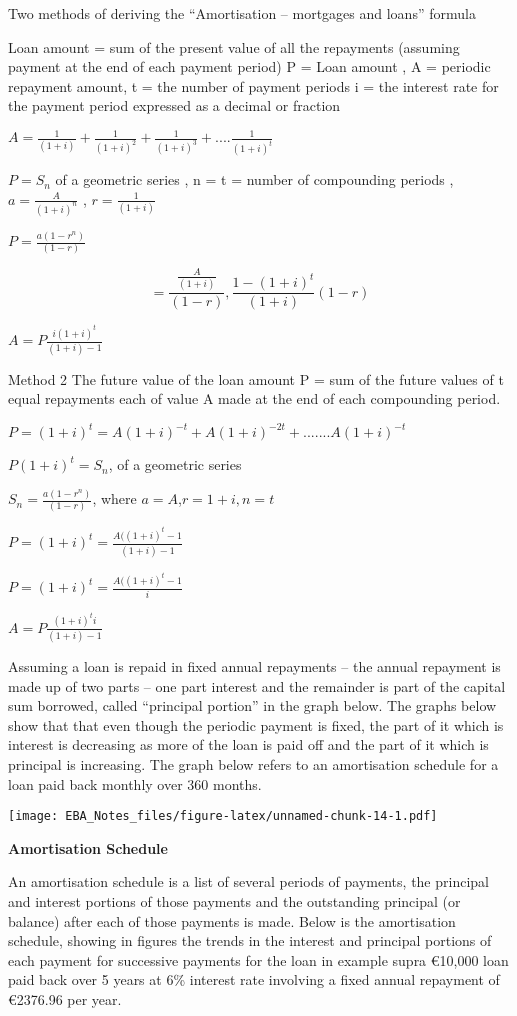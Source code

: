 \documentclass[]{book}
\newcommand{\euro}{€}
\theoremstyle{definition}
\theoremstyle{definition}
\theoremstyle{definition}
\theoremstyle{remark}
\begin{document}
Two methods of deriving the ``Amortisation -- mortgages and loans''
formula

Loan amount = sum of the present value of all the repayments (assuming
payment at the end of each payment period) P = Loan amount , A =
periodic repayment amount, t = the number of payment periods i = the
interest rate for the payment period expressed as a decimal or fraction

\(A =\frac{1}{(1+i)} + \frac{1}{(1+i)^2} + \frac{1}{(1+i)^3} + .... \frac{1}{(1+i)^t}\)

\(P=S_n\) of a geometric series , n = t = number of compounding periods
, \(a =\frac{A}{(1+i)^n}\) , \(r =\frac{1}{(1+i)}\)

\(P=\frac{a(1-r^n)}{(1-r)}\)

\[=\frac{\frac{A}{(1+i)}}{(1-r)},\frac{1-(1+i)^t}{(1+i)}{(1-r)}\]

\(A=P\frac{i(1+i)^t}{(1+i)-1}\)

Method 2 The future value of the loan amount P = sum of the future
values of t equal repayments each of value A made at the end of each
compounding period.

\(P=(1+i)^t= A(1+i)^{-t} + A(1+i)^{-2t}+.......A(1+i)^{-t}\)

\(P(1+i)^t=S_n\), of a geometric series

\(S_n= \frac{a(1-r^n)}{(1-r)}\), where \(a= A\),\(r=1+i,n=t\)

\(P=(1+i)^t =\frac{A((1+i)^{t}-1}{(1+i)-1}\)

\(P=(1+i)^t=\frac{A((1+i)^{t}-1}{i}\)

\(A=P\frac{(1+i)^{t}i}{(1+i)-1}\)

Assuming a loan is repaid in fixed annual repayments -- the annual
repayment is made up of two parts -- one part interest and the remainder
is part of the capital sum borrowed, called ``principal portion'' in the
graph below. The graphs below show that that even though the periodic
payment is fixed, the part of it which is interest is decreasing as more
of the loan is paid off and the part of it which is principal is
increasing. The graph below refers to an amortisation schedule for a
loan paid back monthly over 360 months.

\texttt{[image: EBA\_Notes\_files/figure-latex/unnamed-chunk-14-1.pdf]}

\textbf{Amortisation Schedule}

An amortisation schedule is a list of several periods of payments, the
principal and interest portions of those payments and the outstanding
principal (or balance) after each of those payments is made. Below is
the amortisation schedule, showing in figures the trends in the interest
and principal portions of each payment for successive payments for the
loan in example supra \euro{}10,000 loan paid back over 5 years at 6\%
interest rate involving a fixed annual repayment of \euro{}2376.96 per
year.
\end{document}

